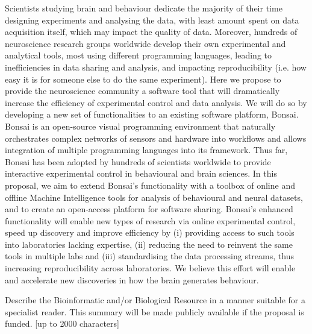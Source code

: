 Scientists studying brain and behaviour dedicate the majority of their time designing experiments and analysing the data, with least amount spent on data acquisition itself, which may impact the quality of data. Moreover, hundreds of neuroscience research groups worldwide develop their own experimental and analytical tools, most using different programming languages, leading to  inefficiencies in data sharing and analysis, and impacting reproducibility (i.e. how easy it is for someone else to do the same experiment). 
Here we propose to provide the neuroscience community a software tool that will dramatically increase the efficiency of experimental control and data analysis. We will do so by developing a new set of functionalities to an existing software platform, Bonsai. Bonsai is an open-source visual programming environment that naturally orchestrates complex networks of sensors and hardware into workflows and allows integration of multiple programming languages into its framework. Thus far, Bonsai has been adopted by hundreds of scientists worldwide to provide interactive experimental control in behavioural and brain sciences. In this proposal, we aim to extend Bonsai’s functionality with a toolbox of online and offline Machine Intelligence tools for analysis of behavioural and neural datasets, and to create an open-access platform for software sharing. Bonsai’s enhanced functionality will enable new types of research via online experimental control, speed up discovery and improve efficiency by (i) providing access to such tools into laboratories lacking expertise, (ii) reducing the need to reinvent the same tools in multiple labs and (iii) standardising the data processing streams, thus increasing reproducibility across laboratories. We believe this effort will enable and accelerate new discoveries in how the brain generates behaviour. 



Describe the Bioinformatic and/or Biological Resource in a manner suitable for a specialist reader. This summary will be made publicly available if the proposal is funded. [up to 2000 characters]


